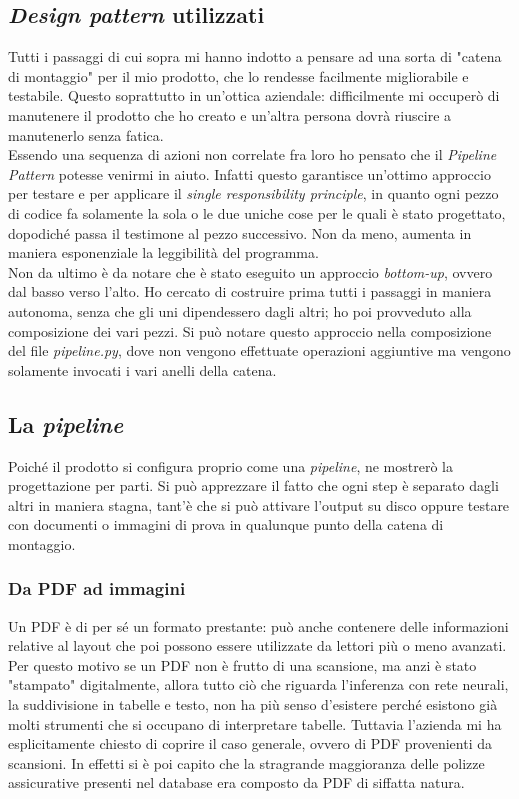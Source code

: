     \subsection{\textit{Design pattern} utilizzati}
    Tutti i passaggi di cui sopra mi hanno indotto a pensare ad una sorta di "catena di montaggio" per il mio prodotto, che lo rendesse facilmente migliorabile e testabile. Questo soprattutto in un'ottica aziendale: difficilmente mi occuperò di manutenere il prodotto che ho creato e un'altra persona dovrà riuscire a manutenerlo senza fatica.
    \medskip
    \\Essendo una sequenza di azioni non correlate fra loro ho pensato che il \textit{Pipeline Pattern}\cite{site:pipeline-pattern} potesse venirmi in aiuto. Infatti questo garantisce un'ottimo approccio per testare e per applicare il \textit{single responsibility principle}\cite{site:single-responsibility-principle}, in quanto ogni pezzo di codice fa solamente la sola o le due uniche cose per le quali è stato progettato, dopodiché passa il testimone al pezzo successivo. Non da meno, aumenta in maniera esponenziale la leggibilità del programma.
    \medskip
    \\Non da ultimo è da notare che è stato eseguito un approccio \textit{bottom-up}, ovvero dal basso verso l'alto. Ho cercato di costruire prima tutti i passaggi in maniera autonoma, senza che gli uni dipendessero dagli altri; ho poi provveduto alla composizione dei vari pezzi. Si può notare questo approccio nella composizione del file \textit{pipeline.py}, dove non vengono effettuate operazioni aggiuntive ma vengono solamente invocati i vari anelli della catena.
    
    \subsection{La \textit{pipeline}}
    Poiché il prodotto si configura proprio come una \textit{pipeline}, ne mostrerò la progettazione per parti. Si può apprezzare il fatto che ogni step è separato dagli altri in maniera stagna, tant'è che si può attivare l'output su disco oppure testare con documenti o immagini di prova in qualunque punto della catena di montaggio. 
        \subsubsection{Da PDF ad immagini}
        Un PDF è di per sé un formato prestante: può anche contenere delle informazioni relative al layout che poi possono essere utilizzate da lettori più o meno avanzati. Per questo motivo se un PDF non è frutto di una scansione, ma anzi è stato "stampato" digitalmente, allora tutto ciò che riguarda l'inferenza con rete neurali, la suddivisione in tabelle e testo, non ha più senso d'esistere perché esistono già molti strumenti che si occupano di interpretare tabelle.
        Tuttavia l'azienda mi ha esplicitamente chiesto di coprire il caso generale, ovvero di PDF provenienti da scansioni. In effetti si è poi capito che la stragrande maggioranza delle polizze assicurative presenti nel database era composto da PDF di siffatta natura.
